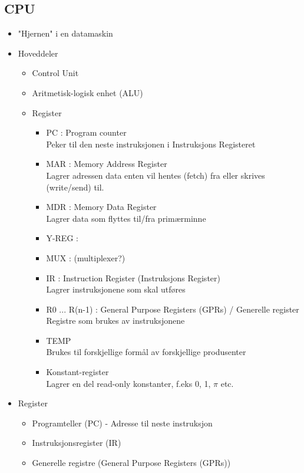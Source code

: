 \documentclass{article}
\begin{document}
		\subsection{CPU}
			\begin{itemize}
				\item "Hjernen" i en datamaskin
				\item Hoveddeler
					\begin{itemize}
						\item Control Unit
						\item Aritmetisk-logisk enhet (ALU)
						\item Register
							\begin{itemize}
								\item PC : Program counter \\
									\small Peker til den neste instruksjonen i Instruksjons Registeret
								\item MAR : Memory Address Register \\
									\small Lagrer adressen data enten vil hentes (fetch) fra eller skrives (write/send) til.
								\item MDR : Memory Data Register \\
									\small Lagrer data som flyttes til/fra primærminne
								\item Y-REG : 
								\item MUX : (multiplexer?)
								\item IR : Instruction Register (Instruksjons Register) \\
									\small Lagrer instruksjonene som skal utføres
								\item R0 ... R(n-1) : General Purpose Registers (GPRs) / Generelle register \\
									\small Registre som brukes av instruksjonene
								\item TEMP \\
									\small Brukes til forskjellige formål av forskjellige produsenter
								\item Konstant-register \\
									\small Lagrer en del read-only konstanter, f.eks 0, 1, $\pi$ etc.
							\end{itemize}
					\end{itemize}
				\item Register
					\begin{itemize}
						\item Programteller (PC) - Adresse til neste instruksjon
						\item Instruksjonsregister (IR)
						\item Generelle registre (General Purpose Registers (GPRs))
					\end{itemize}
			\end{itemize}
\end{document}
